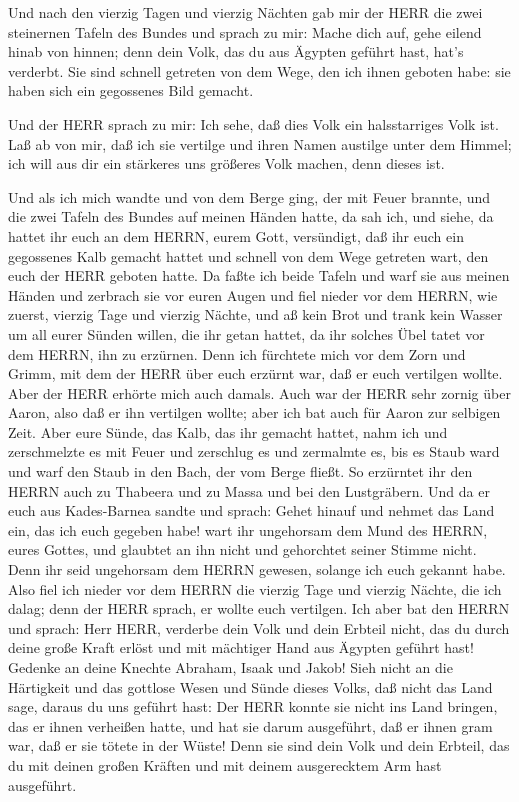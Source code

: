  Und nach den vierzig Tagen und vierzig Nächten gab mir der
HERR die zwei steinernen Tafeln des Bundes  und sprach zu
mir: Mache dich auf, gehe eilend hinab von hinnen; denn dein Volk, das
du aus Ägypten geführt hast, hat's verderbt. Sie sind schnell getreten
von dem Wege, den ich ihnen geboten habe: sie haben sich ein gegossenes
Bild gemacht.

 Und der HERR sprach zu mir: Ich sehe, daß dies Volk ein
halsstarriges Volk ist.  Laß ab von mir, daß ich sie
vertilge und ihren Namen austilge unter dem Himmel; ich will aus dir ein
stärkeres uns größeres Volk machen, denn dieses ist.

 Und als ich mich wandte und von dem Berge ging, der mit
Feuer brannte, und die zwei Tafeln des Bundes auf meinen Händen hatte,
 da sah ich, und siehe, da hattet ihr euch an dem HERRN,
eurem Gott, versündigt, daß ihr euch ein gegossenes Kalb gemacht hattet
und schnell von dem Wege getreten wart, den euch der HERR geboten hatte.
 Da faßte ich beide Tafeln und warf sie aus meinen Händen
und zerbrach sie vor euren Augen  und fiel nieder vor dem
HERRN, wie zuerst, vierzig Tage und vierzig Nächte, und aß kein Brot und
trank kein Wasser um all eurer Sünden willen, die ihr getan hattet, da
ihr solches Übel tatet vor dem HERRN, ihn zu erzürnen. 
Denn ich fürchtete mich vor dem Zorn und Grimm, mit dem der HERR über
euch erzürnt war, daß er euch vertilgen wollte. Aber der HERR erhörte
mich auch damals.  Auch war der HERR sehr zornig über
Aaron, also daß er ihn vertilgen wollte; aber ich bat auch für Aaron zur
selbigen Zeit.  Aber eure Sünde, das Kalb, das ihr gemacht
hattet, nahm ich und zerschmelzte es mit Feuer und zerschlug es und
zermalmte es, bis es Staub ward und warf den Staub in den Bach, der vom
Berge fließt.  So erzürntet ihr den HERRN auch zu Thabeera
und zu Massa und bei den Lustgräbern.  Und da er euch aus
Kades-Barnea sandte und sprach: Gehet hinauf und nehmet das Land ein,
das ich euch gegeben habe! wart ihr ungehorsam dem Mund des HERRN, eures
Gottes, und glaubtet an ihn nicht und gehorchtet seiner Stimme nicht.
 Denn ihr seid ungehorsam dem HERRN gewesen, solange ich
euch gekannt habe.  Also fiel ich nieder vor dem HERRN die
vierzig Tage und vierzig Nächte, die ich dalag; denn der HERR sprach, er
wollte euch vertilgen.  Ich aber bat den HERRN und sprach:
Herr HERR, verderbe dein Volk und dein Erbteil nicht, das du durch deine
große Kraft erlöst und mit mächtiger Hand aus Ägypten geführt hast!
 Gedenke an deine Knechte Abraham, Isaak und Jakob! Sieh
nicht an die Härtigkeit und das gottlose Wesen und Sünde dieses Volks,
 daß nicht das Land sage, daraus du uns geführt hast: Der
HERR konnte sie nicht ins Land bringen, das er ihnen verheißen hatte,
und hat sie darum ausgeführt, daß er ihnen gram war, daß er sie tötete
in der Wüste!  Denn sie sind dein Volk und dein Erbteil,
das du mit deinen großen Kräften und mit deinem ausgerecktem Arm hast
ausgeführt.


